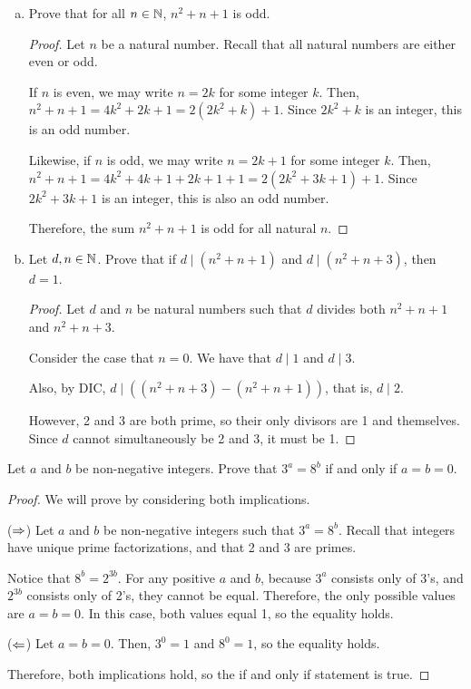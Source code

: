 \documentclass{agony}
\begin{document}
\question \begin{enumerate}[(a)]
  \item Prove that for all $n\in\mathbb{N}$, $n^2+n+1$ is odd.
        \begin{proof}
          Let $n$ be a natural number.
          Recall that all natural numbers are either even or odd.

          If $n$ is even, we may write $n=2k$ for some integer $k$.
          Then, $n^2+n+1 = 4k^2 + 2k + 1 = 2(2k^2+k) + 1$.
          Since $2k^2+k$ is an integer, this is an odd number.

          Likewise, if $n$ is odd, we may write $n=2k+1$ for some integer $k$.
          Then, $n^2+n+1 = 4k^2+4k+1 + 2k+1 + 1 = 2(2k^2+3k+1)+1$.
          Since $2k^2+3k+1$ is an integer, this is also an odd number.

          Therefore, the sum $n^2+n+1$ is odd for all natural $n$.
        \end{proof}
  \item Let $d,n\in\mathbb{N}$.
        Prove that if $d \mid (n^2+n+1)$ and $d \mid (n^2+n+3)$, then $d=1$.
        \begin{proof}
          Let $d$ and $n$ be natural numbers such that $d$ divides both $n^2+n+1$ and $n^2+n+3$.

          Consider the case that $n = 0$.
          We have that $d \mid 1$ and $d \mid 3$.

          Also, by DIC, $d \mid \left((n^2+n+3) - (n^2+n+1)\right)$, that is, $d \mid 2$.

          However, 2 and 3 are both prime, so their only divisors are 1 and themselves.
          Since $d$ cannot simultaneously be 2 and 3, it must be 1.
        \end{proof}
\end{enumerate}


\question Let $a$ and $b$ be non-negative integers.
Prove that $3^a=8^b$ if and only if $a=b=0$.
\begin{proof}
  We will prove by considering both implications.

  ($\Rightarrow$) Let $a$ and $b$ be non-negative integers such that $3^a=8^b$.
  Recall that integers have unique prime factorizations, and that 2 and 3 are primes.

  Notice that $8^b=2^{3b}$.
  For any positive $a$ and $b$, because $3^a$ consists only of 3's, and $2^{3b}$ consists only of 2's, they cannot be equal.
  Therefore, the only possible values are $a=b=0$.
  In this case, both values equal 1, so the equality holds.

  ($\Leftarrow$) Let $a=b=0$. Then, $3^0=1$ and $8^0=1$, so the equality holds.

  Therefore, both implications hold, so the if and only if statement is true.
\end{proof}
\end{document}
